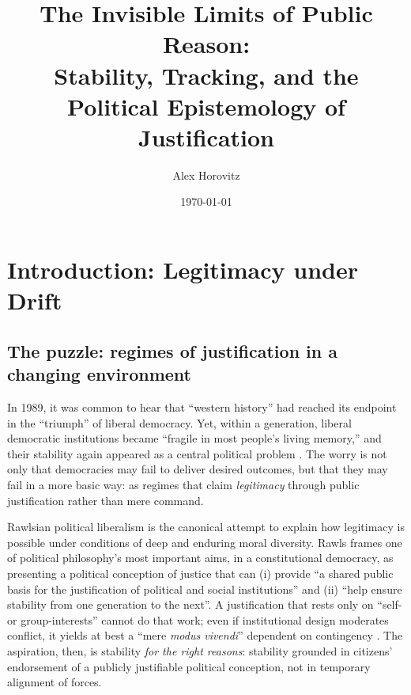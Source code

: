 \documentclass[12pt]{report}
\title{The Invisible Limits of Public Reason:\\
Stability, Tracking, and the Political Epistemology of Justification}
\author{Alex Horovitz}
\date{\today}
\begin{document}

\maketitle

\tableofcontents
\clearpage
{}


\chapter{Introduction: Legitimacy under Drift}

\section{The puzzle: regimes of justification in a changing environment}

In 1989, it was common to hear that ``western history'' had reached its endpoint in the ``triumph'' of liberal democracy.  Yet, within a generation, liberal democratic institutions became ``fragile in most people's living memory,'' and their stability again appeared as a central political problem \parencite[p.1187]{Weithman2024Rescuing}.  The worry is not only that democracies may fail to deliver desired outcomes, but that they may fail in a more basic way: as regimes that claim \emph{legitimacy} through public justification rather than mere command.

Rawlsian political liberalism is the canonical attempt to explain how legitimacy is possible under conditions of deep and enduring moral diversity.  Rawls frames one of political philosophy's most important aims, in a constitutional democracy, as presenting a political conception of justice that can (i) provide ``a shared public basis for the justification of political and social institutions'' and (ii) ``help ensure stability from one generation to the next''.  A justification that rests only on ``self- or group-interests'' cannot do that work; even if institutional design moderates conflict, it yields at best a ``mere \emph{modus vivendi}'' dependent on contingency \parencite[p.~1]{rawls1987overlapping}.  The aspiration, then, is stability \emph{for the right reasons}: stability grounded in citizens' endorsement of a publicly justifiable political conception, not in temporary alignment of forces.
\end{document}
